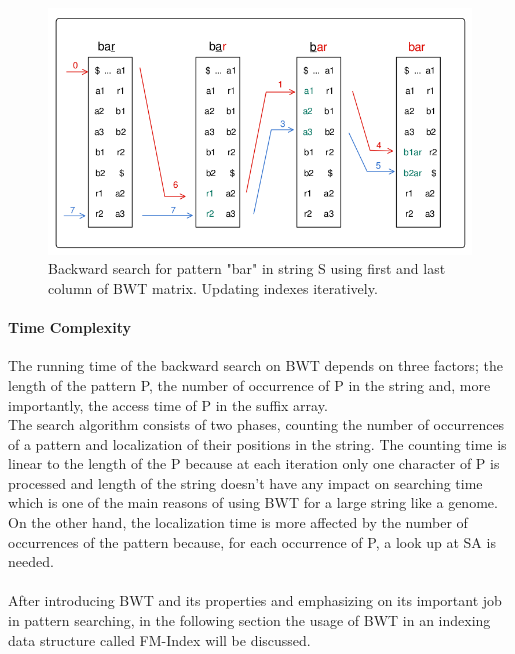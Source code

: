\documentclass[11pt,a4paper]{report}
\begin{document}
\begin{figure}[H]
\centering
\includegraphics[width=12cm]{pictures/bar_1.png}
\caption{Backward search for pattern "bar" in 
string S using first and 
last column of BWT matrix. Updating indexes 
iteratively.}
\label{backwardSearch}
\end{figure}



\paragraph{Time Complexity}

The running time of the backward search on BWT 
depends on three factors; the length of the 
pattern P, the number of occurrence of P in 
the string and, more importantly, the access 
time of P in the suffix array.\\
The search algorithm consists of two phases, 
counting the number of occurrences of a pattern 
and localization of their positions in the string.
The counting time is linear to the length of 
the P because at each iteration only one character 
of P is processed and length of the string doesn't 
have any impact on searching time which is one 
of the main reasons of using BWT for a large 
string like a genome. On the other hand, the 
localization time is more affected by the number 
of occurrences of the pattern  because, for 
each occurrence of P, a look up at SA is needed.
\\\\

After introducing BWT and its properties and 
emphasizing on its important job in pattern 
searching, in the following section the usage 
of BWT in an indexing data structure called 
FM-Index will be discussed\cite{fmindex}. 




\end{document}
